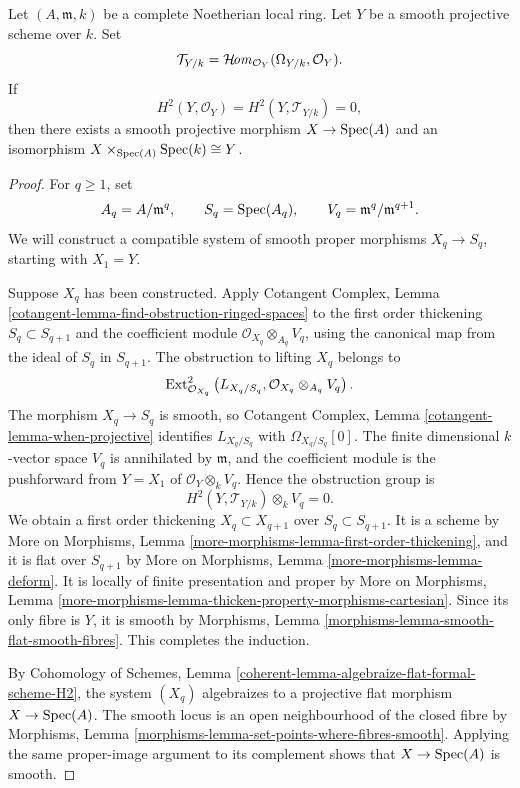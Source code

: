 \begin{lemma}
\label{lemma-projective-lift-complete-local}
\begin{reference}
\cite[Expos\'e 182, Corollaire 3, p. 206]{FGA}
\end{reference}
Let $(A, \mathfrak m, k)$ be a complete Noetherian local ring. Let $Y$ be
a smooth projective scheme over $k$. Set
$$
\mathcal{T}_{Y/k} =
\mathop{\mathcal{H}\!\mathit{om}}\nolimits_{\mathcal{O}_Y}(\Omega_{Y/k}, \mathcal{O}_Y).
$$
If
$$
H^2(Y, \mathcal{O}_Y) = H^2(Y, \mathcal{T}_{Y/k}) = 0,
$$
then there exists a smooth projective morphism $X \to \mathop{\mathrm{Spec}}(A)$ and an
isomorphism $X \times_{\mathop{\mathrm{Spec}}(A)} \mathop{\mathrm{Spec}}(k) \cong Y$.
\end{lemma}

\begin{proof}
For $q \geq 1$, set
$$
A_q = A/\mathfrak m^q, \qquad
S_q = \mathop{\mathrm{Spec}}(A_q), \qquad
V_q = \mathfrak m^q/\mathfrak m^{q + 1}.
$$
We will construct a compatible system of smooth proper morphisms
$X_q \to S_q$, starting with $X_1 = Y$.

Suppose $X_q$ has been constructed. Apply Cotangent
Complex, Lemma \ref{cotangent-lemma-find-obstruction-ringed-spaces} to the
first order thickening $S_q \subset S_{q + 1}$ and the coefficient module
$\mathcal{O}_{X_q} \otimes_{A_q} V_q$, using the canonical map from the
ideal of $S_q$ in $S_{q + 1}$. The obstruction to lifting $X_q$ belongs to
$$
\mathop{\mathrm{Ext}}\nolimits^2_{\mathcal{O}_{X_q}}
\left(L_{X_q/S_q}, \mathcal{O}_{X_q} \otimes_{A_q} V_q\right).
$$
The morphism $X_q \to S_q$ is smooth, so Cotangent Complex, Lemma
\ref{cotangent-lemma-when-projective} identifies $L_{X_q/S_q}$ with
$\Omega_{X_q/S_q}[0]$. The finite dimensional $k$-vector space $V_q$ is
annihilated by $\mathfrak m$, and the coefficient module is the pushforward
from $Y = X_1$ of $\mathcal{O}_Y \otimes_k V_q$. Hence the obstruction
group is
$$
H^2(Y, \mathcal{T}_{Y/k}) \otimes_k V_q = 0.
$$
We obtain a first order thickening $X_q \subset X_{q + 1}$ over
$S_q \subset S_{q + 1}$. It is a scheme by More on Morphisms, Lemma
\ref{more-morphisms-lemma-first-order-thickening}, and it is flat over
$S_{q + 1}$ by More on Morphisms, Lemma
\ref{more-morphisms-lemma-deform}. It is locally of finite presentation and
proper by More on Morphisms, Lemma
\ref{more-morphisms-lemma-thicken-property-morphisms-cartesian}. Since its
only fibre is $Y$, it is smooth by Morphisms, Lemma
\ref{morphisms-lemma-smooth-flat-smooth-fibres}.
This completes the induction.

By Cohomology of Schemes, Lemma
\ref{coherent-lemma-algebraize-flat-formal-scheme-H2}, the system $(X_q)$
algebraizes to a projective flat morphism $X \to \mathop{\mathrm{Spec}}(A)$. The smooth
locus is an open neighbourhood of the closed fibre by
Morphisms, Lemma \ref{morphisms-lemma-set-points-where-fibres-smooth}.
Applying the same proper-image argument to its complement shows that
$X \to \mathop{\mathrm{Spec}}(A)$ is smooth.
\end{proof}

